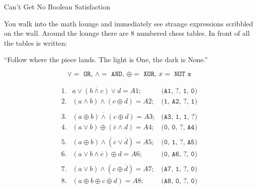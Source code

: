 \documentclass[12pt]{article}
\begin{document}
\Large

\vspace*{10px}
\begin{center}
\huge{Can't Get No Boolean Satisfaction}
\end{center}
\vspace*{10px}

\vspace{.2in}
You walk into the math lounge and immediately see strange expressions scribbled on the wall. Around the lounge
there are $8$ numbered chess tables. In front of all the tables is written: 

\begin{center}
``Follow where the piece lands. The light is One, the dark is None.''

\underline{\hspace{1cm}} \underline{\hspace{1cm}} \underline{\hspace{1cm}} \underline{\hspace{1cm}} 
\end{center}

\vspace{.2in}

$$\lor = \texttt{ OR, } \land = \texttt{ AND, } \oplus = \texttt{ XOR, } \overline{x} = \texttt{ NOT x}$$


\vspace{.3in}


\[ \begin{array}{ccc}
    1. & a \lor \overline{(b \land c)} \lor d = A1; & \texttt{(A1, ?, 1, 0)} \\
    2. & (a \land b) \land (c \oplus d) = A2; & \texttt{(1, A2, ?, 1)} \\ 
        \\
    3. & \overline{(a \oplus b) \land (c \oplus d)} = A3; & \texttt{(A3, 1, 1, ?)} \\
    4. & (a \lor b) \oplus (\overline{c} \land d) = A4; & \texttt{(0, 0, ?, A4)} \\
        \\
    5. & (a \oplus b) \land (c \lor \overline{d}) = A5; & \texttt{(0, 1, ?, A5)} \\
    6. & (a \lor b \land \overline{c}) \oplus d = A6; & \texttt{(0, A6, ?, 0)} \\
        \\
    7. & (a \lor b) \land (c \oplus \overline{d}) = A7; & \texttt{(A7, 1, ?, 0)} \\
    8. & (a \oplus b \oplus c \oplus d) = A8; & \texttt{(A8, 0, ?, 0)} \\
\end{array} \]
\end{document}
